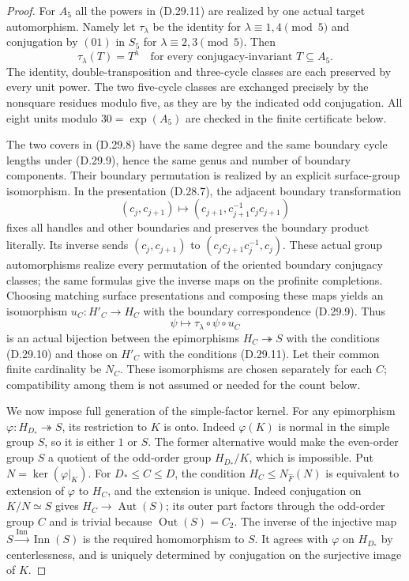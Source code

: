 \begin{proof}
For $A_5$ all the powers in \textup{(D.29.11)} are
realized by one actual target automorphism.  Namely
let $\tau_\lambda$ be the identity for
$\lambda\equiv1,4\pmod5$ and conjugation by $(01)$
in $S_5$ for $\lambda\equiv2,3\pmod5$.
Then
\[
       \tau_\lambda(T)=T^\lambda
       \quad\text{for every conjugacy-invariant }T\subseteq A_5.
 \tag{D.29.12}
\]
The identity, double-transposition and three-cycle
classes are each preserved by every unit power.
The two five-cycle classes are exchanged precisely
by the nonsquare residues modulo five, as they are
by the indicated odd conjugation.  All eight units
modulo $30=\exp(A_5)$ are checked in the finite
certificate below.

The two covers in \textup{(D.29.8)} have the same
degree and the same boundary cycle lengths under
\textup{(D.29.9)}, hence the same genus and number
of boundary components.  Their boundary permutation
is realized by an explicit surface-group isomorphism.
In the presentation \textup{(D.28.7)}, the adjacent
boundary transformation
\[
 (c_j,c_{j+1})\longmapsto
       (c_{j+1},c_{j+1}^{-1}c_jc_{j+1})
 \tag{D.29.13}
\]
fixes all handles and other boundaries and preserves
the boundary product literally.  Its inverse sends
$(c_j,c_{j+1})$ to
$(c_jc_{j+1}c_j^{-1},c_j)$.
These actual group automorphisms realize every
permutation of the oriented boundary conjugacy
classes; the same formulas give the inverse maps
on the profinite completions.
Choosing matching surface presentations and composing
these maps yields an isomorphism
$u_C:H'_C\to H_C$ with the boundary correspondence
\textup{(D.29.9)}.
Thus
\[
                   \psi\longmapsto
                \tau_\lambda\circ\psi\circ u_C
 \tag{D.29.14}
\]
is an actual bijection between the epimorphisms
$H_C\twoheadrightarrow S$ with the conditions
\textup{(D.29.10)} and those on $H'_C$ with the
conditions \textup{(D.29.11)}.
Let their common finite cardinality be $N_C$.
These isomorphisms are chosen separately for each
$C$; compatibility among them is not assumed or
needed for the count below.

We now impose full generation of the simple-factor
kernel.  For any epimorphism
$\varphi:H_{D_*}\twoheadrightarrow S$, its
restriction to $K$ is onto.  Indeed $\varphi(K)$ is
normal in the simple group $S$, so it is either $1$
or $S$.  The former alternative would make the
even-order group $S$ a quotient of the odd-order
group $H_{D_*}/K$, which is impossible.
Put $N=\ker(\varphi|_K)$.
For $D_*\leq C\leq D$, the condition
$H_C\leq N_{\widehat F}(N)$ is equivalent to
extension of $\varphi$ to $H_C$, and the extension
is unique.  Indeed conjugation on $K/N\simeq S$
gives $H_C\to\operatorname{Aut}(S)$; its outer
part factors through the odd-order group $C$ and is
trivial because $\operatorname{Out}(S)=C_2$.
The inverse of the injective map
$S\xrightarrow{\operatorname{Inn}}\operatorname{Inn}(S)$
is the required homomorphism to $S$.
It agrees with $\varphi$ on $H_{D_*}$ by
centerlessness, and is uniquely determined by
conjugation on the surjective image of $K$.


\end{proof}

